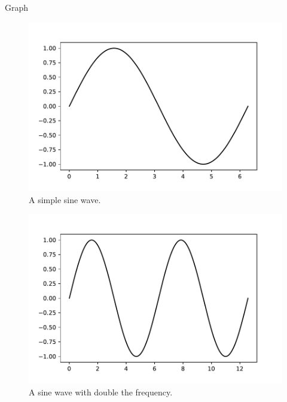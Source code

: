 \documentclass{beamer}
\begin{document}
\begin{frame}{Graph}

\begin{figure}
\includegraphics[width=\textwidth]{figs/sin} 
\caption{\label{fig:your-figure} A simple sine wave.}
\end{figure}
\end{frame}

\begin{frame}

\begin{figure}
\includegraphics[width=\textwidth]{figs/2sin} 
\caption{\label{fig:your-figure} A sine wave with double the frequency.}
\end{figure}

\end{frame}{}
\end{document}
